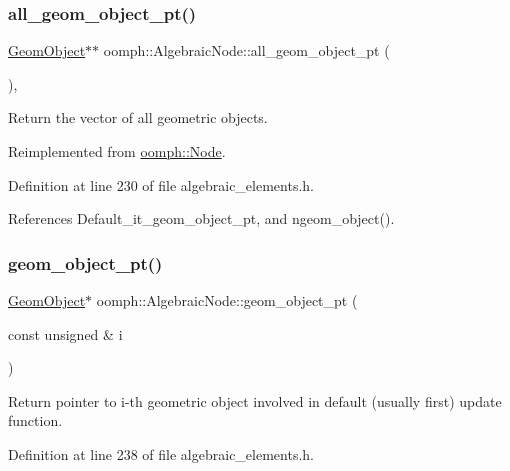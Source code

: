 \subsubsection{\texorpdfstring{all\+\_\+geom\+\_\+object\+\_\+pt()}{all\_geom\_object\_pt()}}
{\footnotesize\ttfamily \hyperlink{classoomph_1_1GeomObject}{Geom\+Object}$\ast$$\ast$ oomph\+::\+Algebraic\+Node\+::all\+\_\+geom\+\_\+object\+\_\+pt (\begin{DoxyParamCaption}{ }\end{DoxyParamCaption})\hspace{0.3cm}{\ttfamily [inline]}, {\ttfamily [virtual]}}



Return the vector of all geometric objects. 



Reimplemented from \hyperlink{classoomph_1_1Node_a2e05b79b6b3249e3ebd9096a550c93b6}{oomph\+::\+Node}.



Definition at line 230 of file algebraic\+\_\+elements.\+h.



References Default\+\_\+it\+\_\+geom\+\_\+object\+\_\+pt, and ngeom\+\_\+object().

\mbox{\label{classoomph_1_1AlgebraicNode_a6ea1dc01f3b657b5c63d6de2b67ea990}} 
\subsubsection{\texorpdfstring{geom\+\_\+object\+\_\+pt()}{geom\_object\_pt()}}
{\footnotesize\ttfamily \hyperlink{classoomph_1_1GeomObject}{Geom\+Object}$\ast$ oomph\+::\+Algebraic\+Node\+::geom\+\_\+object\+\_\+pt (\begin{DoxyParamCaption}\item[{const unsigned \&}]{i }\end{DoxyParamCaption})\hspace{0.3cm}{\ttfamily [inline]}}



Return pointer to i-\/th geometric object involved in default (usually first) update function. 



Definition at line 238 of file algebraic\+\_\+elements.\+h.



